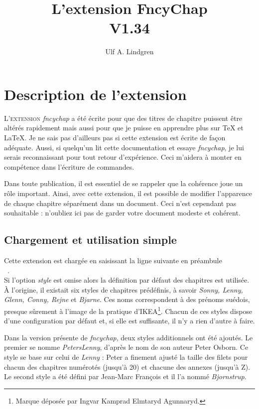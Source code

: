 \documentclass{report}
\title{L'extension FncyChap\\V1.34}
\author{Ulf A. Lindgren}
\date{}
\newcommand{\sk}{\vspace{0.2 cm}}
\newcommand{\A}[1]{{$\backslash${\tt #1}}}
\newcommand{\nsp}{\mbox{\hspace{-1 cm}}}
\begin{document}
  \maketitle
  \tableofcontents
  \chapter{Description de l'extension}
    \lettrine[findent=0.2em,nindent=0em,realheight=true]{L'}{extension} 
    \textsl{fncychap} a été écrite pour que des titres de chapitre puissent
    être altérés rapidement mais aussi pour que je puisse en apprendre plus sur
    \TeX{} et \LaTeX{}. Je ne sais pas d'ailleurs pas si cette extension est 
    écrite de façon adéquate. Aussi, si quelqu'un lit cette documentation et
    essaye \textsl{fncychap}, je lui serais reconnaissant pour tout retour 
    d'expérience. Ceci m'aidera à monter en compétence dans l'écriture de 
    commandes. 
 
    Dans toute publication, il est essentiel de se rappeler que la cohérence
    joue un rôle important. Ainsi, avec cette extension, il est possible de
    modifier l'apparence de chaque chapitre séparément dans un document. Ceci
    n'est cependant pas souhaitable : n'oubliez ici pas de garder votre
    document modeste et cohérent.

    \section{Chargement et utilisation simple}
    Cette extension est chargée en saisissant la ligne suivante en 
    préambule\sk\\    
    \nsp\fbox{\A{usepackage}[{\em style}]\{{\em fncychap}\}}\ .\sk\\    
    Si l'option \emph{style} est omise alors la définition par défaut des 
    chapitres est utilisée. À l'origine, il existait six styles de chapitres
    prédéfinis, à savoir \emph{Sonny, Lenny, Glenn, Conny, Rejne} et 
    \emph{Bjarne}. Ces noms correspondent à des prénoms suédois, presque 
    sûrement à l'image de la pratique d'IKEA\footnote{Marque déposée par Ingvar
    Kamprad Elmtaryd Agunnaryd.}. 
    Chacun de ces styles dispose d'une configuration par défaut et, si elle
    est suffisante, il n'y a rien d'autre à faire.

    Dans la version présente de \textsl{fncychap}, deux styles additionnels
    ont été ajoutés. Le premier se nomme \emph{PetersLenny}, d'après le nom de
    son auteur Peter Osborn. Ce style se base sur celui de \emph{Lenny} : Peter
    a finement ajusté la taille des filets pour chacun des chapitres numérotés
    (jusqu'à 20) et chacune des annexes (jusqu'à Z). Le second style a été 
    défini par Jean-Marc François et il l'a nommé \textsl{Bjornstrup}.
\end{document}
